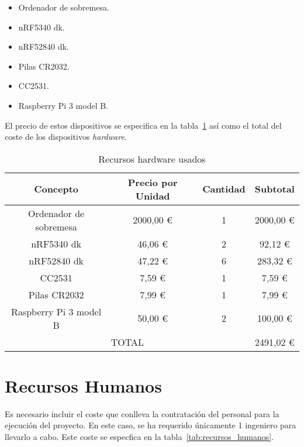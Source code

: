 \begin{itemize}
    \item Ordenador de sobremesa.
    \item nRF5340 dk.
    \item nRF52840 dk.
    \item Pilas CR2032.
    \item CC2531.
    \item Raspberry Pi 3 model B.
\end{itemize}

El precio de estos dispositivos se especifica en la tabla~\ref{tab:recursos_hardware} así como el total del coste de los dispositivos \textit{hardware}.

\begin{table}[H]
\centering
\begin{tabular}{|c|c|c|c|}
\hline
Concepto                & Precio por Unidad & Cantidad & Subtotal \\ \hline
Ordenador de sobremesa  & 2000,00 \euro                & 1        & 2000,00 \euro       \\ \hline
nRF5340 dk              & 46,06   \euro                & 2        & 92,12   \euro       \\ \hline
nRF52840 dk             & 47,22   \euro                & 6        & 283,32  \euro       \\ \hline
CC2531                  & 7,59    \euro                & 1        & 7,59    \euro       \\ \hline
Pilas CR2032            & 7,99    \euro                & 1        & 7,99    \euro       \\ \hline
Raspberry Pi 3 model B  & 50,00   \euro                & 2        & 100,00  \euro       \\ \hline
\multicolumn{3}{|c|}{TOTAL}                                       & 2491,02 \euro       \\ \hline
\end{tabular}
\caption{Recursos hardware usados}
\label{tab:recursos_hardware}
\end{table}


\section{Recursos Humanos}\label{sec:presupuesto-mano}

Es necesario incluir el coste que conlleva la contratación del personal para la ejecución del proyecto.
En este caso, se ha requerido únicamente 1 ingeniero para llevarlo a cabo.
Este coste se especfica en la tabla~\ref{tab:recursos_humanos}.

